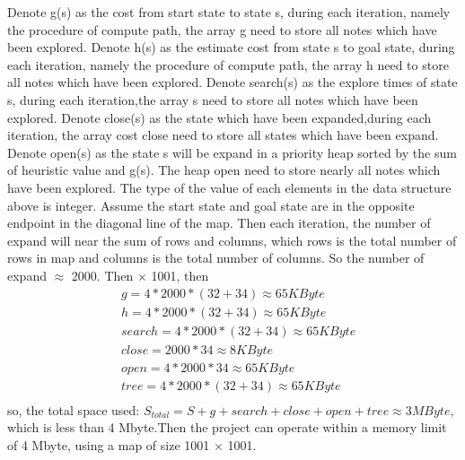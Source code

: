 Denote g(s) as the cost from start state to state s, during each iteration, namely the procedure of compute path, the array g need to store all notes which have been explored. 
Denote h(s) as the estimate cost from state s to goal state, during each iteration, namely the procedure of compute path, the array h need to store all notes which have been explored. 
Denote search(s) as the explore times of state s, during each iteration,the array s need to store all notes which have been explored. 
Denote close(s) as the state which have been expanded,during each iteration, the array cost close need to store all states which have been expand.
Denote open(s) as the state s will be expand in a priority heap sorted by the sum of heuristic value and g(s). The heap open need to store nearly all notes which have been explored. 
The type of the value of each elements in the data structure above is integer.
Assume the start state and goal state are in the opposite endpoint in the 
diagonal line of the map. Then each iteration, the number of expand will near the sum of rows and columns, which rows is the total number of rows in map and columns is the total number of columns. So the number of expand $\approx$ 2000.
Then 
$\times$ 1001, then
\begin{equation*}
  \begin{aligned}
   &g = 4 * 2000 * (32 + 34) \approx 65 KByte\\
   &h = 4 * 2000 * (32 + 34) \approx 65 KByte\\
   &search = 4 * 2000 * (32 + 34) \approx 65 KByte\\
   &close = 2000 * 34 \approx 8 KByte\\
   &open = 4 * 2000 * 34 \approx 65 KByte\\
   &tree = 4 * 2000 * (32 + 34) \approx 65 KByte\\
  \end{aligned}
\end{equation*}
so, the total space used: 
$S_{total} = S +  g + search + close + open + tree \approx 3 MByte$, which is less than 4 Mbyte.Then the project can operate within a memory limit of 4 Mbyte, using a map of size 1001 $\times$ 1001.\\

